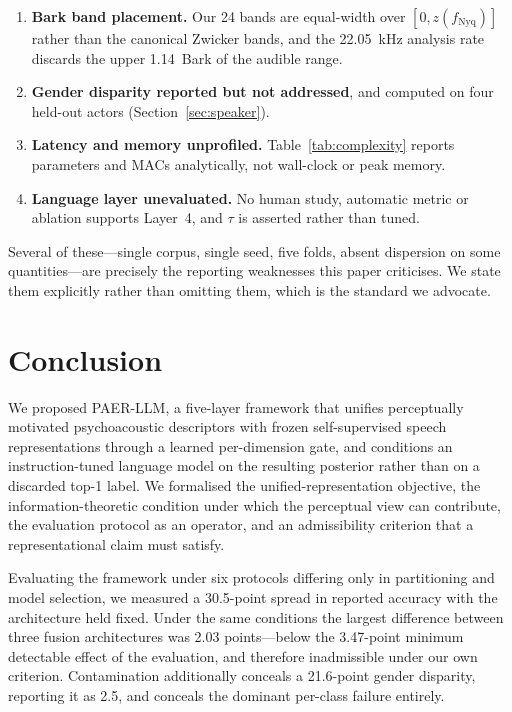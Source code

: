 \documentclass[journal,onecolumn,11pt,draftclsnofoot]{IEEEtran}   %
\begin{document}
\begin{enumerate}
    uncompetitive is established at $K = 4$ only.
  \item \textbf{Bark band placement.} Our 24 bands are equal-width over
    $[0, z(f_{\mathrm{Nyq}})]$ rather than the canonical Zwicker bands, and the
    22.05~kHz analysis rate discards the upper 1.14~Bark of the audible range.
  \item \textbf{Gender disparity reported but not addressed}, and computed on
    four held-out actors (Section~\ref{sec:speaker}).
  \item \textbf{Latency and memory unprofiled.} Table~\ref{tab:complexity}
    reports parameters and MACs analytically, not wall-clock or peak memory.
  \item \textbf{Language layer unevaluated.} No human study, automatic metric or
    ablation supports Layer~4, and $\tau$ is asserted rather than tuned.
\end{enumerate}

Several of these---single corpus, single seed, five folds, absent dispersion on
some quantities---are precisely the reporting weaknesses this paper criticises.
We state them explicitly rather than omitting them, which is the standard we
advocate.

\section{Conclusion}
\label{sec:conclusion}
We proposed PAER-LLM, a five-layer framework that unifies perceptually motivated
psychoacoustic descriptors with frozen self-supervised speech representations
through a learned per-dimension gate, and conditions an instruction-tuned
language model on the resulting posterior rather than on a discarded top-1
label. We formalised the unified-representation objective, the
information-theoretic condition under which the perceptual view can contribute,
the evaluation protocol as an operator, and an admissibility criterion that a
representational claim must satisfy.

Evaluating the framework under six protocols differing only in partitioning and
model selection, we measured a 30.5-point spread in reported accuracy with the
architecture held fixed. Under the same conditions the largest difference
between three fusion architectures was 2.03 points---below the 3.47-point
minimum detectable effect of the evaluation, and therefore inadmissible under
our own criterion. Contamination additionally conceals a 21.6-point gender
disparity, reporting it as 2.5, and conceals the dominant per-class failure
entirely.
\end{document}
